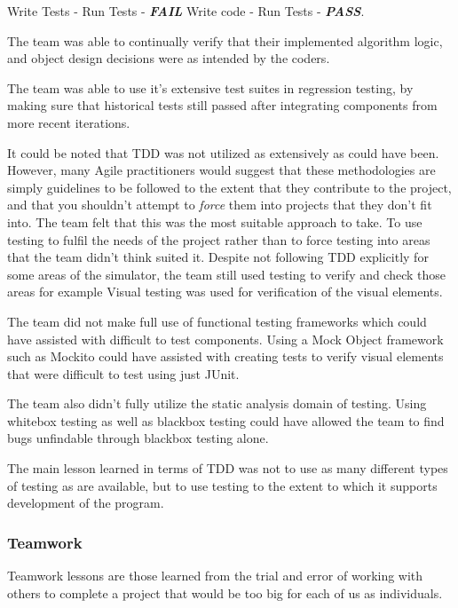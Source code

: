 \documentclass[11pt]{article}
\begin{document}
\begin{enumerate}
	Write Tests - Run Tests - \textbf {\textit{FAIL}} \rightarrow Write code - Run Tests - \textbf {\textit{PASS}}. 
	
	The team was able to continually verify that their implemented algorithm logic, and object design decisions were as intended by the coders.
	
	The team was able to use it's extensive test suites in regression testing, by making sure that historical tests still passed after integrating components from more recent iterations.
	
	It could be noted that TDD was not utilized as extensively as could have been. However, many Agile practitioners would suggest that these methodologies are simply guidelines to be followed to the extent that they contribute to the project, and that you shouldn't attempt to \textit{force} them into projects that they don't fit into. The team felt that this was the most suitable approach to take. To use testing to fulfil the needs of the project rather than to force testing into areas that the team didn't think suited it. Despite not following TDD explicitly for some areas of the simulator, the team still used testing to verify and check those areas for example Visual testing was used for verification of the visual elements.
	
	The team did not make full use of functional testing frameworks which could have assisted with difficult to test components. Using a Mock Object framework such as Mockito could have assisted with creating tests to verify visual elements that were difficult to test using just JUnit.
	
	The team also didn't fully utilize the static analysis domain of testing. Using whitebox testing as well as blackbox testing could have allowed the team to find bugs unfindable through blackbox testing alone.
	
	The main lesson learned in terms of TDD was not to use as many different types of testing as are available, but to use testing to the extent to which it supports development of the program.
	
	
\end{enumerate}
\subsubsection{Teamwork}

Teamwork lessons are those learned from the trial and error of working with others to complete a project that would be too big for each of us as individuals.
\end{document}
